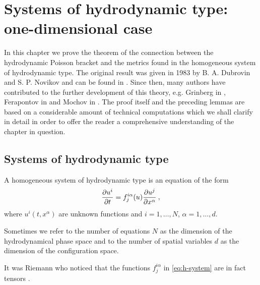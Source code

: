 \chapter{Systems of hydrodynamic type: one-dimensional case}

In this chapter we prove the theorem of the connection between the hydrodynamic Poisson bracket and the metrics found in the homogeneous system of hydrodynamic type. The original result was given in 1983 by B. A. Dubrovin and S. P. Novikov and can be found in \cite{Dubrovin-Novikov}. Since then, many authors have contributed to the further development of this theory, e.g. Grinberg in \cite{Grinberg}, Ferapontov in \cite{Ferapontov} and Mochov in \cite{Mochov}.
The proof itself and the preceding lemmas are based on a considerable amount of technical computations which we shall clarify in detail in order to offer the reader a comprehensive understanding of the chapter in question.


\section{Systems of hydrodynamic type}

\begin{definition}
    A homogeneous system of hydrodynamic type is an equation of the form
    \begin{align}
        \label{eq:h-system}
        \frac{\partial u^i}{\partial t} = f_j^{i \alpha} (u) \frac{\partial u^j}{\partial x^\alpha} \:,
    \end{align}
    where $u^i(t,x^\alpha)$ are unknown functions and $i = 1, \dots , N$, $\alpha = 1, \dots , d$.
\end{definition}

Sometimes we refer to the number of equations $N$ as the dimension of the hydrodynamical phase space and to the number of spatial variables $d$ as the dimension of the configuration space.

It was Riemann who noticed that the functions $f^{i \alpha}_j$ in \eqref{eq:h-system} are in fact tensors \cite{Dubrovin-Novikov}.

